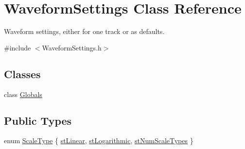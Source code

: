 \hypertarget{class_waveform_settings}{}\section{Waveform\+Settings Class Reference}
\label{class_waveform_settings}


Waveform settings, either for one track or as defaults.  




{\ttfamily \#include $<$Waveform\+Settings.\+h$>$}

\subsection*{Classes}
\begin{DoxyCompactItemize}
\item 
class \hyperlink{class_waveform_settings_1_1_globals}{Globals}
\end{DoxyCompactItemize}
\subsection*{Public Types}
\begin{DoxyCompactItemize}
\item 
enum \hyperlink{class_waveform_settings_a62e3323b180e270201c4bd5bcf52b4e4}{Scale\+Type} \{ \hyperlink{class_waveform_settings_a62e3323b180e270201c4bd5bcf52b4e4a54fba21bb1212c84ffd56a4f510bc8dc}{st\+Linear}, 
\hyperlink{class_waveform_settings_a62e3323b180e270201c4bd5bcf52b4e4a2e6fe9dffc2c1d6bbcfaaee36df90f68}{st\+Logarithmic}, 
\hyperlink{class_waveform_settings_a62e3323b180e270201c4bd5bcf52b4e4affbe3e59f50e587141441ae8055ce30d}{st\+Num\+Scale\+Types}
 \}
\end{DoxyCompactItemize}
